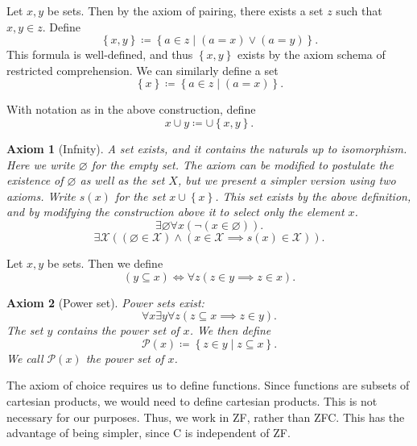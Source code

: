 \documentclass{article}
\newtheorem{axiom}{Axiom}
\begin{document}
\begin{construction}\label{const:pair}
	Let $x,y$ be sets. Then by the axiom of pairing, there exists a set $z$ such that $x,y\in z$. Define
	\[
		\left\{ x,y \right\} \coloneqq \left\{ a\in z\mid (a=x)\lor (a=y) \right\} 
	.\]
	This formula is well-defined, and thus $\left\{ x,y \right\} $ exists by the axiom schema of restricted comprehension. We can similarly define a set
	\[
		\left\{ x \right\} \coloneqq \left\{ a\in z \mid (a=x) \right\} 
	.\]
\end{construction}
\begin{definition}\label{dfn:union-pair}
	With notation as in the above construction, define
	\[
		x\cup y \coloneqq \cup \left\{ x,y \right\} 
	.\]
\end{definition}

\begin{axiom}[Infnity]\label{axiom:infinity}
	A set exists, and it contains the naturals up to isomorphism. Here we write $\varnothing $ for the empty set. The axiom can be modified to postulate the existence of $\varnothing $ as well as the set $X$, but we present a simpler version using two axioms. Write $s(x)$ for the set $x\cup \left\{ x \right\} $. This set exists by the above definition, and by modifying the construction above it to select only the element $x$.
	\[
		\exists \varnothing \forall x(\neg(x\in \varnothing ))
	.\]
	\[
		\exists \mathcal{X}\left( (\varnothing \in \mathcal{X})\land (x\in \mathcal{X} \implies s(x)\in \mathcal{X}) \right) 
	.\]
\end{axiom}
\begin{definition}[Subset]\label{dfn:subset}
	Let $x,y$ be sets. Then we define
	\[
		(y\subseteq x) \iff \forall z(z\in y \implies z\in x)
	.\]
\end{definition}
\begin{axiom}[Power set]\label{axiom:powerset}
	Power sets exist:
	\[
		\forall x\exists y \forall z(z \subseteq x \implies z\in y)
	.\]
	The set $y$ contains the power set of $x$. We then define
	\[
		\mathcal{P} (x) \coloneqq \left\{ z\in y \mid z\subseteq x \right\} 
	.\]
	We call $\mathcal{P} (x)$ the \emph{power set} of $x$.
\end{axiom}

\begin{remark}
	The axiom of choice requires us to define functions. Since functions are subsets of cartesian products, we would need to define cartesian products. This is not necessary for our purposes. Thus, we work in ZF, rather than ZFC. This has the advantage of being simpler, since C is independent of ZF.
\end{remark}
\end{document}
